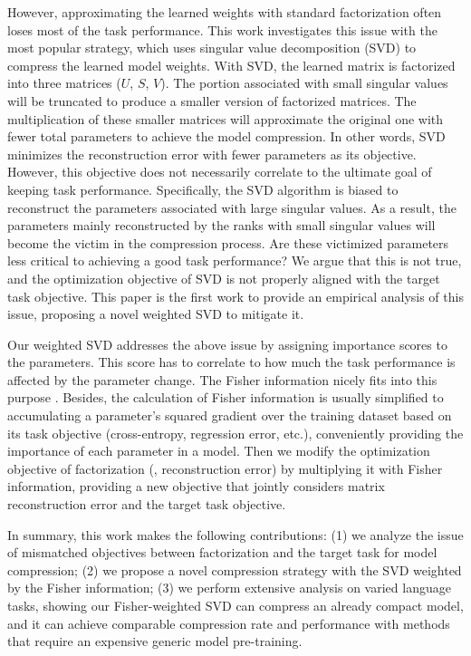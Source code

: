 However, approximating the learned weights with standard factorization often loses most of the task performance. This work investigates this issue with the most popular strategy, which uses singular value decomposition (SVD) to compress the learned model weights. With SVD, the learned matrix is factorized into three matrices ($U$, $S$, $V$). The portion associated with small singular values will be truncated to produce a smaller version of factorized matrices. The multiplication of these smaller matrices will approximate the original one with fewer total parameters to achieve the model compression. In other words, SVD minimizes the reconstruction error with fewer parameters as its objective. However, this objective does not necessarily correlate to the ultimate goal of keeping task performance. Specifically, the SVD algorithm is biased to reconstruct the parameters associated with large singular values. As a result, the parameters mainly reconstructed by the ranks with small singular values will become the victim in the compression process. Are these victimized parameters less critical to achieving a good task performance? We argue that this is not true, and the optimization objective of SVD is not properly aligned with the target task objective. 
This paper is the first work to provide an empirical analysis of this issue, proposing a novel weighted SVD to mitigate it. 

Our weighted SVD addresses the above issue by assigning importance scores to the parameters. This score has to correlate to how much the task performance is affected by the parameter change. The Fisher information nicely fits into this purpose \citep{Pascanu14revisitingnatural}. Besides, the calculation of Fisher information is usually simplified to accumulating a parameter's squared gradient over the training dataset based on its task objective (\eg cross-entropy, regression error, etc.), conveniently providing the importance of each parameter in a model. Then we modify the optimization objective of factorization (\ie, reconstruction error) by multiplying it with Fisher information, providing a new objective that jointly considers matrix reconstruction error and the target task objective. 

In summary, this work makes the following contributions: (1) we analyze the issue of mismatched objectives between factorization and the target task for model compression; (2) we propose a novel compression strategy with the SVD weighted by the Fisher information; (3) we perform extensive analysis on varied language tasks, showing our Fisher-weighted SVD can compress an already compact model, and it can achieve comparable compression rate and performance with methods that require an expensive generic model pre-training.
